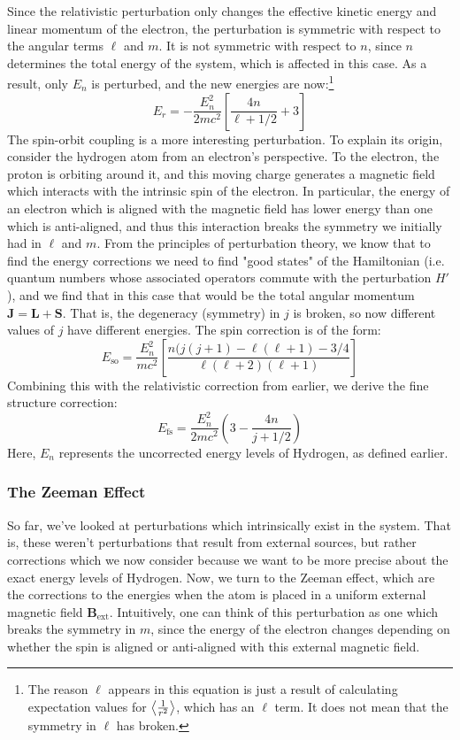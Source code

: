 \documentclass[10pt]{article}
\begin{document}
	Since the relativistic perturbation only changes the effective kinetic energy and
	linear momentum of the electron, the perturbation is symmetric with respect to
	the angular terms \( \ell \) and \( m \). It is not symmetric with respect to \(
	n\), since \( n \) determines the total energy of the system, which is affected
	in this case. As a result, only \( E_n \) is perturbed, and the new energies are
	now:\footnote{The reason \( \ell \) appears in this equation is just a result of 
		calculating expectation values for \( \left\langle \frac{1}{r^2} \right\rangle \), 
		which has an \( \ell \) term. It does not mean that the symmetry in 
	\( \ell \) has broken.}
	\[
		E_{r} = -\frac{E_n^2}{2mc^2}\left[ \frac{4n}{\ell + 1 / 2} + 3 \right]
	\]
	The spin-orbit coupling is a more interesting perturbation. To explain its
	origin, consider the hydrogen atom from an electron's perspective. To the
	electron, the proton is orbiting around it, and this moving charge generates a
	magnetic field which interacts with the intrinsic spin of the electron. In
	particular, the energy of an electron which is aligned with the magnetic field
	has lower energy than one which is anti-aligned, and thus this interaction breaks
	the symmetry we initially had in \( \ell \) and \( m \). From the principles of
	perturbation theory, we know that to find the energy corrections we need to find
	"good states" of the Hamiltonian (i.e. quantum numbers whose associated operators
	commute with the perturbation \( H' \)), and we find that in this case that would
	be the total angular momentum \( \mathbf{J} = \mathbf{L} + \mathbf{S} \). That
	is, the degeneracy (symmetry) in \( j \) is broken, so now different values of \(
	j\) have different energies. The spin correction is of the form:
	\[
		E_\text{so} = \frac{E_n^2}{mc^2} \left[ \frac{n(j(j + 1) - \ell( \ell + 1)
		- 3 / 4}{\ell(\ell + 2)(\ell + 1)} \right]
	\]
	Combining this with the relativistic correction from earlier, we derive the fine
	structure correction:
	\[
		E_\text{fs} = \frac{E_n^2}{2mc^2}\left( 3 - \frac{4n}{j + 1 / 2} \right)
	\]
	Here, \( E_n \) represents the uncorrected energy levels of Hydrogen, as defined
	earlier.

	\subsubsection{The Zeeman Effect}
	So far, we've looked at perturbations which intrinsically exist in the system.
	That is, these weren't perturbations that result from external sources, but
	rather corrections which we now consider because we want to be more precise
	about the exact energy levels of Hydrogen. Now, we turn to the Zeeman effect,
	which are the corrections to the energies when the atom is placed in a uniform
	external magnetic field \( \mathbf{B}_\text{ext} \). 
	Intuitively, one can think of this
	perturbation as one which breaks the symmetry in \( m \), since the energy of the
	electron changes depending on whether the spin is aligned or anti-aligned with
	this external magnetic field. 
\end{document}
